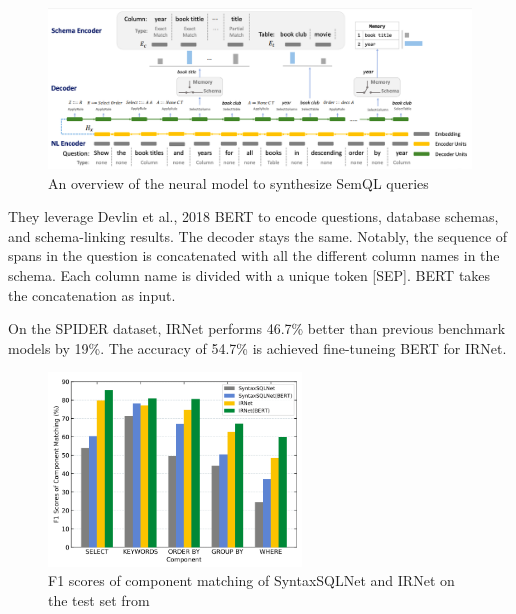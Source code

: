 \begin{figure}[htb]
    \centering
    \includegraphics[width=1\textwidth]{pics/IRNet/overview}
    \caption{An overview of the neural model to synthesize SemQL queries\cite{DBLP:journals/corr/abs-1905-08205}}
    \label{fig:overview}
\end{figure}

They leverage Devlin et al., 2018 BERT\cite{devlin-etal-2019-bert} to encode questions, database schemas, and schema-linking results. The decoder stays the same. Notably, the sequence of spans in the question is concatenated with all the different column names in the schema. Each column name is divided with a unique token [SEP]. BERT takes the concatenation as input.

On the SPIDER dataset, IRNet performs 46.7\% better than previous benchmark models by 19\%. The accuracy of 54.7\% is achieved fine-tuneing BERT for IRNet.

\begin{figure}[htb]
    \centering
    \includegraphics[width=0.6\textwidth]{pics/IRNet/f1}
    \caption{F1 scores of component matching of SyntaxSQLNet and IRNet on the test set from \cite{DBLP:journals/corr/abs-1905-08205}}
    \label{fig:f1}
\end{figure}
